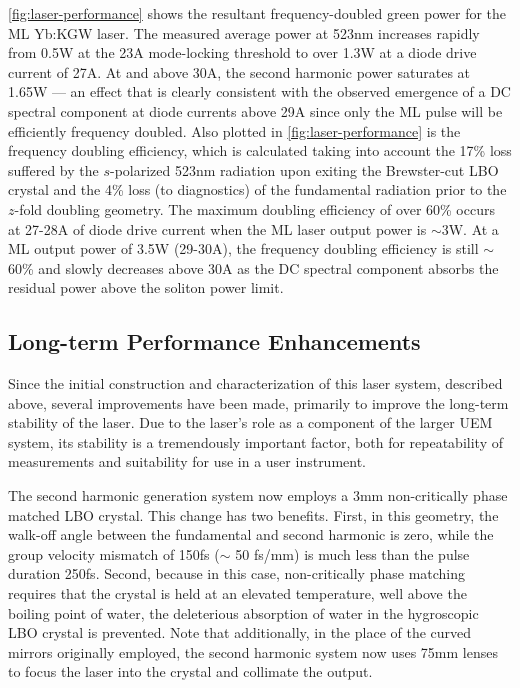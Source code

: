 \ref{fig:laser-performance} shows the resultant frequency-doubled green power for the ML Yb:KGW laser.
The measured average power at 523nm increases rapidly from 0.5W at the 23A mode-locking threshold to over 1.3W at a diode drive current of 27A.
At and above 30A, the second harmonic power saturates at 1.65W --- an effect that is clearly consistent with the observed emergence of a DC spectral component at diode currents above 29A since only the ML pulse will be efficiently frequency doubled.
Also plotted in \ref{fig:laser-performance} is the frequency doubling efficiency, which is calculated taking into account the 17\% loss suffered by the $s$-polarized 523nm radiation upon exiting the Brewster-cut LBO crystal and the 4\% loss (to diagnostics) of the fundamental radiation prior to the $z$-fold doubling geometry.
The maximum doubling efficiency of over 60\% occurs at 27-28A of diode drive current when the ML laser output power is $\sim$3W.
At a ML output power of 3.5W (29-30A), the frequency doubling efficiency is still $\sim$60\% and slowly decreases above 30A as the DC spectral component absorbs the residual power above the soliton power limit.

\subsection{Long-term Performance Enhancements}

Since the initial construction and characterization of this laser system, described above, several improvements have been made, primarily to improve the long-term stability of the laser.
Due to the laser's role as a component of the larger UEM system, its stability is a tremendously important factor, both for repeatability of measurements and suitability for use in a user instrument.

The second harmonic generation system now employs a 3mm non-critically phase matched LBO crystal.
This change has two benefits. 
First, in this geometry, the walk-off angle between the fundamental and second harmonic is zero, while the group velocity mismatch of 150fs ($\sim$ 50 fs/mm) is much less than the pulse duration 250fs. %
Second, because in this case, non-critically phase matching requires that the crystal is held at an elevated temperature, well above the boiling point of water, the deleterious absorption of water in the hygroscopic LBO crystal is prevented.
Note that additionally, in the place of the curved mirrors originally employed, the second harmonic system now uses 75mm lenses to focus the laser into the crystal and collimate the output.

